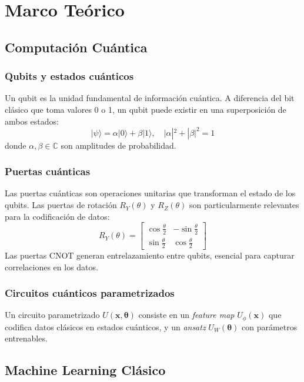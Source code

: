 \section{Marco Te\'orico}

\subsection{Computaci\'on Cu\'antica}

\subsubsection{Qubits y estados cu\'anticos}
Un qubit es la unidad fundamental de informaci\'on cu\'antica. A diferencia del bit cl\'asico que toma valores 0 o 1, un qubit puede existir en una superposici\'on de ambos estados:
\begin{equation}
|\psi\rangle = \alpha|0\rangle + \beta|1\rangle, \quad |\alpha|^2 + |\beta|^2 = 1
\end{equation}
donde $\alpha, \beta \in \mathbb{C}$ son amplitudes de probabilidad.

\subsubsection{Puertas cu\'anticas}
Las puertas cu\'anticas son operaciones unitarias que transforman el estado de los qubits. Las puertas de rotaci\'on $R_Y(\theta)$ y $R_Z(\theta)$ son particularmente relevantes para la codificaci\'on de datos:
\begin{equation}
R_Y(\theta) = \begin{bmatrix} \cos\frac{\theta}{2} & -\sin\frac{\theta}{2} \\ \sin\frac{\theta}{2} & \cos\frac{\theta}{2} \end{bmatrix}
\end{equation}
Las puertas CNOT generan entrelazamiento entre qubits, esencial para capturar correlaciones en los datos.

\subsubsection{Circuitos cu\'anticos parametrizados}
Un circuito parametrizado $U(\mathbf{x}, \boldsymbol{\theta})$ consiste en un \textit{feature map} $U_\phi(\mathbf{x})$ que codifica datos cl\'asicos en estados cu\'anticos, y un \textit{ansatz} $U_W(\boldsymbol{\theta})$ con par\'ametros entrenables.

\subsection{Machine Learning Cl\'asico}

